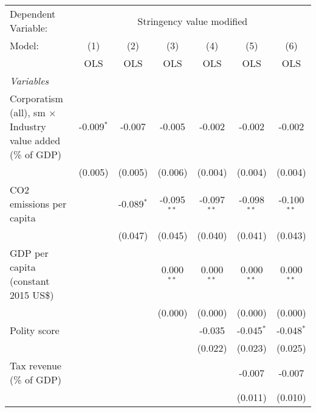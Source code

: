 
\begingroup
\centering
\begin{tabular}{lcccccc}
   \toprule
   Dependent Variable: & \multicolumn{6}{c}{Stringency value modified}\\
   Model:                                                            & (1)          & (2)          & (3)           & (4)           & (5)           & (6)\\  
                                                                     &  OLS         & OLS          & OLS           & OLS           & OLS           & OLS\\  
   \midrule
   \emph{Variables}\\
   Corporatism (all), sm $\times$ Industry value added (\% of GDP)   & -0.009$^{*}$ & -0.007       & -0.005        & -0.002        & -0.002        & -0.002\\   
                                                                     & (0.005)      & (0.005)      & (0.006)       & (0.004)       & (0.004)       & (0.004)\\   
   CO2 emissions per capita                                          &              & -0.089$^{*}$ & -0.095$^{**}$ & -0.097$^{**}$ & -0.098$^{**}$ & -0.100$^{**}$\\   
                                                                     &              & (0.047)      & (0.045)       & (0.040)       & (0.041)       & (0.043)\\   
   GDP per capita (constant 2015 US\$)                               &              &              & 0.000$^{**}$  & 0.000$^{**}$  & 0.000$^{**}$  & 0.000$^{**}$\\   
                                                                     &              &              & (0.000)       & (0.000)       & (0.000)       & (0.000)\\   
   Polity score                                                      &              &              &               & -0.035        & -0.045$^{*}$  & -0.048$^{*}$\\   
                                                                     &              &              &               & (0.022)       & (0.023)       & (0.025)\\   
   Tax revenue (\% of GDP)                                           &              &              &               &               & -0.007        & -0.007\\   
                                                                     &              &              &               &               & (0.011)       & (0.010)\\   

\end{tabular}
